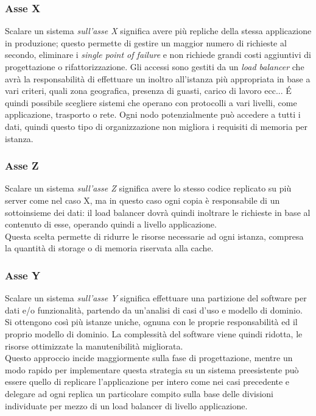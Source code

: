 \subsubsection{Asse X}
Scalare un sistema \textit{sull'asse X} significa avere più repliche della stessa applicazione in produzione; questo permette di gestire un maggior numero di richieste al secondo, eliminare i \textit{single point of failure} e non richiede grandi costi aggiuntivi di progettazione o rifattorizzazione.
Gli accessi sono gestiti da un \textit{load balancer} che avrà la responsabilità di effettuare un inoltro all'istanza più appropriata in base a vari criteri, quali zona geografica, presenza di guasti, carico di lavoro ecc...
\'E quindi possibile scegliere sistemi che operano con protocolli a vari livelli, come applicazione, trasporto o rete.
Ogni nodo potenzialmente può accedere a tutti i dati, quindi questo tipo di organizzazione non migliora i requisiti di memoria per istanza.

\subsubsection{Asse Z}
Scalare un sistema \textit{sull'asse Z} significa avere lo stesso codice replicato su più server come nel caso X, ma in questo caso ogni copia è responsabile di un sottoinsieme dei dati: il load balancer dovrà quindi inoltrare le richieste in base al contenuto di esse, operando quindi a livello applicazione.\\
Questa scelta permette di ridurre le risorse necessarie ad ogni istanza, compresa la quantità di storage o di memoria riservata alla cache.

\subsubsection{Asse Y}
Scalare un sistema \textit{sull'asse Y} significa effettuare una partizione del software per dati e/o funzionalità, partendo da un'analisi di casi d'uso e modello di dominio.\\
Si ottengono così più istanze uniche, ognuna con le proprie responsabilità ed il proprio modello di dominio.
La complessità del software viene quindi ridotta, le risorse ottimizzate la manutenibilità migliorata.\\
Questo approccio incide maggiormente sulla fase di progettazione, mentre un modo rapido per implementare questa strategia su un sistema preesistente può essere quello di replicare l'applicazione per intero come nei casi precedente e delegare ad ogni replica un particolare compito sulla base delle divisioni individuate per mezzo di un load balancer di livello applicazione.

